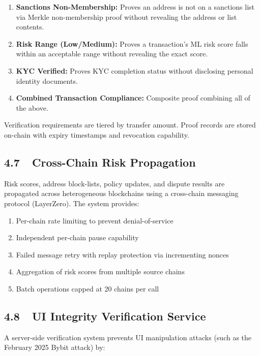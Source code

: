 \documentclass[12pt,a4paper]{article}
\begin{document}
\begin{enumerate}
\item \textbf{Sanctions Non-Membership:} Proves an address is not on a
  sanctions list via Merkle non-membership proof without revealing the address
  or list contents.

\item \textbf{Risk Range (Low/Medium):} Proves a transaction's ML risk
  score falls within an acceptable range without revealing the exact score.

\item \textbf{KYC Verified:} Proves KYC completion status without
  disclosing personal identity documents.

\item \textbf{Combined Transaction Compliance:} Composite proof combining
  all of the above.
\end{enumerate}

Verification requirements are tiered by transfer amount.  Proof records are
stored on-chain with expiry timestamps and revocation capability.

\subsection{4.7~~Cross-Chain Risk Propagation}

Risk scores, address block-lists, policy updates, and dispute results are
propagated across heterogeneous blockchains using a cross-chain messaging
protocol (LayerZero).  The system provides:

\begin{enumerate}
\item Per-chain rate limiting to prevent denial-of-service
\item Independent per-chain pause capability
\item Failed message retry with replay protection via incrementing nonces
\item Aggregation of risk scores from multiple source chains
\item Batch operations capped at 20 chains per call
\end{enumerate}

\subsection{4.8~~UI Integrity Verification Service}

A server-side verification system prevents UI manipulation attacks (such as
the February 2025 Bybit attack) by:
\end{document}
